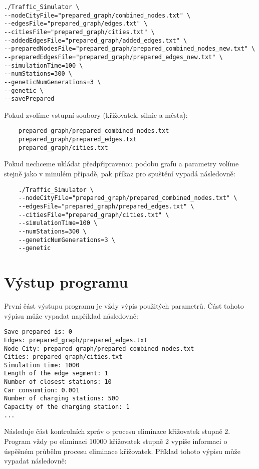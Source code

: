 \begin{Verbatim}
./Traffic_Simulator \
--nodeCityFile="prepared_graph/combined_nodes.txt" \
--edgesFile="prepared_graph/edges.txt" \
--citiesFile="prepared_graph/cities.txt" \
--addedEdgesFile="prepared_graph/added_edges.txt" \
--preparedNodesFile="prepared_graph/prepared_combined_nodes_new.txt" \
--preparedEdgesFile="prepared_graph/prepared_edges_new.txt" \
--simulationTime=100 \
--numStations=300 \
--geneticNumGenerations=3 \
--genetic \
--savePrepared
\end{Verbatim}


Pokud zvolíme vstupní soubory (křižovatek, silnic a města):

\begin{Verbatim}
    prepared_graph/prepared_combined_nodes.txt
    prepared_graph/prepared_edges.txt
    prepared_graph/cities.txt
\end{Verbatim}

Pokud nechceme ukládat předpřipravenou podobu grafu a parametry volíme stejně jako v minulém
případě, pak příkaz pro spuštění vypadá následovně:

\begin{Verbatim}
    ./Traffic_Simulator \
    --nodeCityFile="prepared_graph/prepared_combined_nodes.txt" \
    --edgesFile="prepared_graph/prepared_edges.txt" \
    --citiesFile="prepared_graph/cities.txt" \
    --simulationTime=100 \
    --numStations=300 \
    --geneticNumGenerations=3 \
    --genetic 
\end{Verbatim}


\section{Výstup programu}
První část výstupu programu je vždy výpis použitých parametrů. Část tohoto
výpisu může vypadat například následovně:

\begin{Verbatim}
Save prepared is: 0
Edges: prepared_graph/prepared_edges.txt
Node City: prepared_graph/prepared_combined_nodes.txt
Cities: prepared_graph/cities.txt
Simulation time: 1000
Length of the edge segment: 1
Number of closest stations: 10
Car consumtion: 0.001
Number of charging stations: 500
Capacity of the charging station: 1
...
\end{Verbatim}

Následuje část kontrolních zpráv o procesu eliminace křižovatek stupně 2. 
Program vždy po eliminaci 10000 křižovatek stupně 2 vypíše
informaci o úspěšném průběhu procesu eliminace křižovatek. 
Příklad tohoto výpisu může vypadat následovně:

